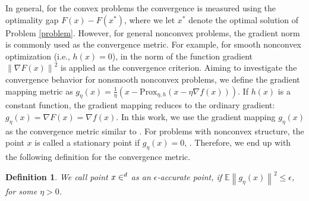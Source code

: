 \documentclass[iicol,sn-basic]{sn-jnl}
\theoremstyle{thmstyleone}%
\theoremstyle{thmstyletwo}%
\theoremstyle{thmstylethree}%
\newtheorem{definition}{Definition}%
\let\R\relax
\newcommand*{\R}{\mathbb{R}}
\newcommand*{\Po}{\text{Prox}}
\newcommand*{\E}{\mathbb{E}}
\newcommand{\norm}[1]{\left\lVert#1\right\rVert}
\begin{document}
In general, for the convex problems the convergence is measured using the optimality gap $F(x) - F(x^*)$, where we let $x^*$ denote the optimal solution of Problem \eqref{problem}. However, for general nonconvex problems, the gradient norm is commonly used as the convergence metric. For example, for smooth nonconvex optimization (i.e., $h(x) = 0$), in \cite{ghadimi2013stochastic,reddi2016stochastic,lei2017non,liu2018zeroth} the norm of the function gradient $\norm{\nabla F(x)}^2$ is applied as the convergence criterion. Aiming to investigate the
convergence behavior for nonsmooth nonconvex problems, we define the gradient mapping metric as $g_{\eta}(x) = \frac{1}{\eta}(x-\Po_{\eta,h}(x-\eta \nabla f(x)))$. 
If $h(x)$ is a constant function, the gradient mapping reduces to the ordinary gradient:
$g_{\eta}(x) = \nabla F(x) = \nabla f(x)$. In this work, we use the gradient mapping $g_{\eta}(x)$ as the convergence metric similar to
\cite{ghadimi2016accelerated,reddi2016proximal,parikh2014proximal}.
For problems with nonconvex structure, the point $x$ is called a stationary point if $g_{\eta}(x) = 0$, \cite{parikh2014proximal}. Therefore, we end up with the following definition for the convergence metric.
\begin{definition}
We call point $x\in \R^d$ as an $\epsilon$-accurate point, if $\E\norm{g_{\eta}(x)}^2 \leq \epsilon$, for some $\eta > 0$.
\end{definition}
\end{document}
